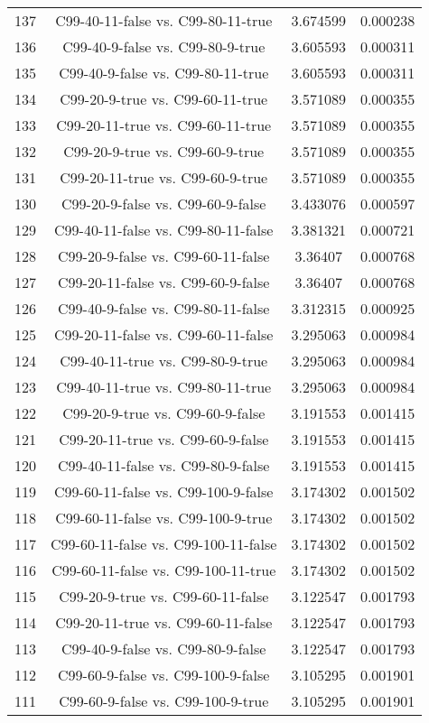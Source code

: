 \documentclass[a4paper,10pt]{article}
\begin{document}
\begin{landscape}
\begin{table}[!htp]
\begin{tabular}{cccc}
137&C99-40-11-false vs. C99-80-11-true&3.674599&0.000238\\
136&C99-40-9-false vs. C99-80-9-true&3.605593&0.000311\\
135&C99-40-9-false vs. C99-80-11-true&3.605593&0.000311\\
134&C99-20-9-true vs. C99-60-11-true&3.571089&0.000355\\
133&C99-20-11-true vs. C99-60-11-true&3.571089&0.000355\\
132&C99-20-9-true vs. C99-60-9-true&3.571089&0.000355\\
131&C99-20-11-true vs. C99-60-9-true&3.571089&0.000355\\
130&C99-20-9-false vs. C99-60-9-false&3.433076&0.000597\\
129&C99-40-11-false vs. C99-80-11-false&3.381321&0.000721\\
128&C99-20-9-false vs. C99-60-11-false&3.36407&0.000768\\
127&C99-20-11-false vs. C99-60-9-false&3.36407&0.000768\\
126&C99-40-9-false vs. C99-80-11-false&3.312315&0.000925\\
125&C99-20-11-false vs. C99-60-11-false&3.295063&0.000984\\
124&C99-40-11-true vs. C99-80-9-true&3.295063&0.000984\\
123&C99-40-11-true vs. C99-80-11-true&3.295063&0.000984\\
122&C99-20-9-true vs. C99-60-9-false&3.191553&0.001415\\
121&C99-20-11-true vs. C99-60-9-false&3.191553&0.001415\\
120&C99-40-11-false vs. C99-80-9-false&3.191553&0.001415\\
119&C99-60-11-false vs. C99-100-9-false&3.174302&0.001502\\
118&C99-60-11-false vs. C99-100-9-true&3.174302&0.001502\\
117&C99-60-11-false vs. C99-100-11-false&3.174302&0.001502\\
116&C99-60-11-false vs. C99-100-11-true&3.174302&0.001502\\
115&C99-20-9-true vs. C99-60-11-false&3.122547&0.001793\\
114&C99-20-11-true vs. C99-60-11-false&3.122547&0.001793\\
113&C99-40-9-false vs. C99-80-9-false&3.122547&0.001793\\
112&C99-60-9-false vs. C99-100-9-false&3.105295&0.001901\\
111&C99-60-9-false vs. C99-100-9-true&3.105295&0.001901\\

\end{tabular}
\end{table}
\end{landscape}
\end{document}

